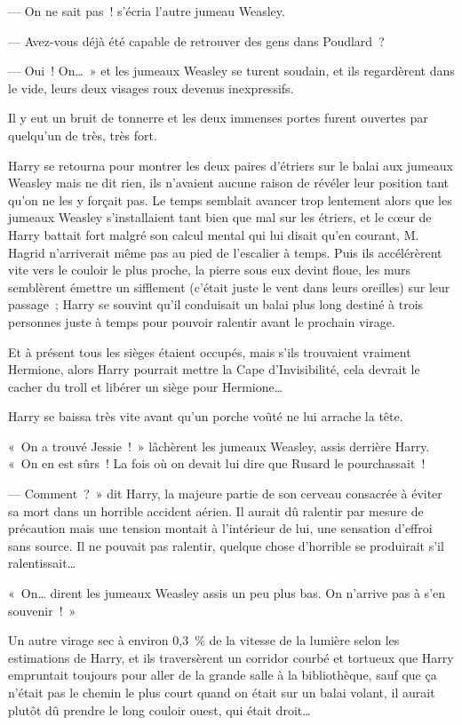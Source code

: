 --- On ne sait pas~! s'écria l'autre jumeau Weasley.

--- Avez-vous déjà été capable de retrouver des gens dans Poudlard~?

--- Oui~!
On…~» et les jumeaux Weasley se turent soudain, et ils regardèrent dans le vide, leurs deux visages roux devenus inexpressifs.

Il y eut un bruit de tonnerre et les deux immenses portes furent ouvertes par quelqu'un de très, très fort.

Harry se retourna pour montrer les deux paires d'étriers sur le balai aux jumeaux Weasley mais ne dit rien, ils n'avaient aucune raison de révéler leur position tant qu'on ne les y forçait pas.
Le temps semblait avancer trop lentement alors que les jumeaux Weasley s'installaient tant bien que mal sur les étriers, et le cœur de Harry battait fort malgré son calcul mental qui lui disait qu'en courant, M. Hagrid n'arriverait même pas au pied de l'escalier à temps.
Puis ils accélérèrent vite vers le couloir le plus proche, la pierre sous eux devint floue, les murs semblèrent émettre un sifflement (c'était juste le vent dans leurs oreilles) sur leur passage~; Harry se souvint qu'il conduisait un balai plus long destiné à trois personnes juste à temps pour pouvoir ralentir avant le prochain virage.

Et à présent tous les sièges étaient occupés, mais s'ils trouvaient vraiment Hermione, alors Harry pourrait mettre la Cape d'Invisibilité, cela devrait le cacher du troll et libérer un siège pour Hermione…

Harry se baissa très vite avant qu'un porche voûté ne lui arrache la tête.

«~On a trouvé Jessie~!~»
lâchèrent les jumeaux Weasley, assis derrière Harry.
«~On en est sûrs~!
La fois où on devait lui dire que Rusard le pourchassait~!

--- Comment~?~»
dit Harry, la majeure partie de son cerveau consacrée à éviter sa mort dans un horrible accident aérien.
Il aurait dû ralentir par mesure de précaution mais une tension montait à l'intérieur de lui, une sensation d'effroi sans source.
Il ne pouvait pas ralentir, quelque chose d'horrible se produirait s'il ralentissait…

«~On… dirent les jumeaux Weasley assis un peu plus bas.
On n'arrive pas à s'en souvenir~!~»

Un autre virage sec à environ 0,3~\% de la vitesse de la lumière selon les estimations de Harry, et ils traversèrent un corridor courbé et tortueux que Harry empruntait toujours pour aller de la grande salle à la bibliothèque, sauf que ça n'était pas le chemin le plus court quand on était sur un balai volant, il aurait plutôt dû prendre le long couloir ouest, qui était droit…

